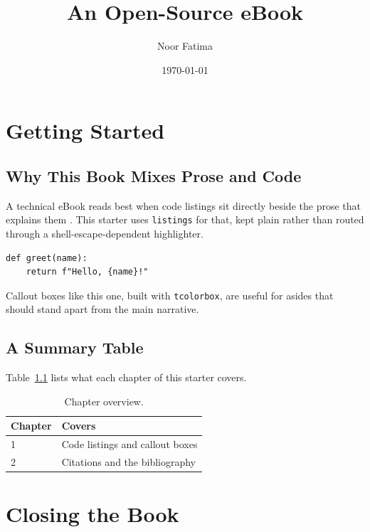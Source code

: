 \documentclass[11pt]{book}
\title{An Open-Source eBook}
\author{Noor Fatima}
\date{\today}
\begin{document}
\maketitle

\tableofcontents

\chapter{Getting Started}

\section{Why This Book Mixes Prose and Code}

A technical eBook reads best when code listings sit directly beside the
prose that explains them \citep{knuth1984texbook}. This starter uses
\texttt{listings} for that, kept plain rather than routed through a
shell-escape-dependent highlighter.

\begin{lstlisting}[caption={A minimal example.}]
def greet(name):
    return f"Hello, {name}!"
\end{lstlisting}

\begin{note}
Callout boxes like this one, built with \texttt{tcolorbox}, are useful for
asides that should stand apart from the main narrative.
\end{note}

\section{A Summary Table}

Table~\ref{tab:chapters} lists what each chapter of this starter covers.

\begin{table}[h]
  \centering
  \begin{tabular}{ll}
    \toprule
    Chapter & Covers \\
    \midrule
    1 & Code listings and callout boxes \\
    2 & Citations and the bibliography \\
    \bottomrule
  \end{tabular}
  \caption{Chapter overview.}
  \label{tab:chapters}
\end{table}

\chapter{Closing the Book}
\end{document}
